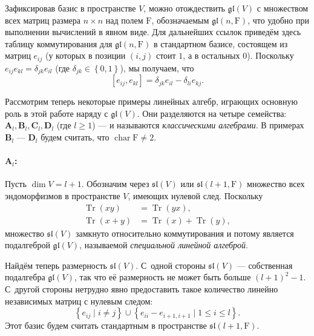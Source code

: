 \documentclass[a4paper, 12pt]{article}
\theoremstyle{definition}
\begin{document}
Зафиксировав базис в пространстве \( V \), можно отождествить \( \mathfrak{gl}(V) \) с множеством всех матриц размера \( n \times n \) над полем \( \mathrm F \), обозначаемым \( \mathfrak{gl}(n, \mathrm F) \), что удобно при выполнении вычислений в явном виде. Для дальнейших ссылок приведём здесь таблицу коммутирования для \({ \mathfrak{gl}(n, \mathrm F) }\) в стандартном базисе, состоящем из матриц \({ e_{ij} }\) (у которых в позиции \({ (i, j) }\) стоит \({ 1 }\), а в остальных \({ 0 }\)). Поскольку \({ e_{ij} e_{kl} = \delta_{jk}  e_{il} }\) (где \({ \delta_{jk} \in \left\{ 0, 1 \right\} }\)), мы получаем, что
\[
    [e_{ij}, e_{kl}] = \delta_{jk} e_{il} - \delta_{li} e_{kj}.
\]

Рассмотрим теперь некоторые примеры линейных алгебр, играющих основную роль в этой работе наряду с \( \mathfrak{gl}(V) \). Они разделяются на четыре семейства: \( \mathbf{A}_l, \mathbf{B}_l, \mathbf{C}_l, \mathbf{D}_l \) (где \( l \geqslant 1 \)) --- и называются \textit{классическими алгебрами}. В примерах \( \mathbf{B}_l \) ---  \( \mathbf{D}_l \) будем считать, что \( \operatorname{char} \mathrm F \neq 2 \).

\paragraph{\( \mathbf{A}_l \):}
Пусть \( \dim V = l + 1 \). Обозначим через \( \mathfrak{sl}(V) \) или \( \mathfrak{sl}(l + 1, \mathrm F) \) множество всех эндоморфизмов в пространстве \( V \), имеющих нулевой след. Поскольку
\begin{align*}
    \operatorname{Tr}(xy) &= \operatorname{Tr}(yx), \\
    \operatorname{Tr}(x + y) &= \operatorname{Tr}(x) + \operatorname{Tr}(y),
\end{align*}
множество \( \mathfrak{sl}(V) \) замкнуто относительно коммутирования и потому является подалгеброй \( \mathfrak{gl}(V) \), называемой \textit{специальной линейной алгеброй}.

Найдём теперь размерность \( \mathfrak{sl}(V) \). С~одной стороны \( \mathfrak{sl}(V) \) --- собственная подалгебра \( \mathfrak{gl}(V) \), так что её размерность не может быть больше \({ (l + 1)^2 - 1 }\). С~другой стороны нетрудно явно предоставить такое количество линейно независимых матриц с нулевым следом:
\[
    \left\{ e_{ij} \mid i \neq j \right\} \cup \left\{ e_{ii} - e_{i + 1, i + 1} \mid 1 \leqslant i \leqslant l \right\}.
\]
Этот базис будем считать стандартным в пространстве \({ \mathfrak{sl}(l + 1, \mathrm F) }\).
\end{document}
